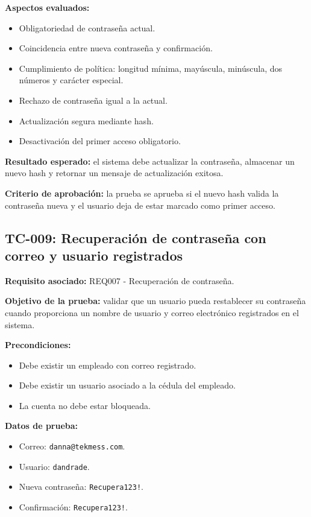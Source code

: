\documentclass[12pt,a4paper]{article}
\begin{document}
\textbf{Aspectos evaluados:}
\begin{itemize}[leftmargin=*]
    \item Obligatoriedad de contraseña actual.
    \item Coincidencia entre nueva contraseña y confirmación.
    \item Cumplimiento de política: longitud mínima, mayúscula, minúscula, dos números y carácter especial.
    \item Rechazo de contraseña igual a la actual.
    \item Actualización segura mediante hash.
    \item Desactivación del primer acceso obligatorio.
\end{itemize}

\textbf{Resultado esperado:} el sistema debe actualizar la contraseña, almacenar un nuevo hash y retornar un mensaje de actualización exitosa.

\textbf{Criterio de aprobación:} la prueba se aprueba si el nuevo hash valida la contraseña nueva y el usuario deja de estar marcado como primer acceso.

\subsection{TC-009: Recuperación de contraseña con correo y usuario registrados}

\textbf{Requisito asociado:} REQ007 - Recuperación de contraseña.

\textbf{Objetivo de la prueba:} validar que un usuario pueda restablecer su contraseña cuando proporciona un nombre de usuario y correo electrónico registrados en el sistema.

\textbf{Precondiciones:}
\begin{itemize}[leftmargin=*]
    \item Debe existir un empleado con correo registrado.
    \item Debe existir un usuario asociado a la cédula del empleado.
    \item La cuenta no debe estar bloqueada.
\end{itemize}

\textbf{Datos de prueba:}
\begin{itemize}[leftmargin=*]
    \item Correo: \texttt{danna@tekmess.com}.
    \item Usuario: \texttt{dandrade}.
    \item Nueva contraseña: \texttt{Recupera123!}.
    \item Confirmación: \texttt{Recupera123!}.
\end{itemize}
\end{document}
